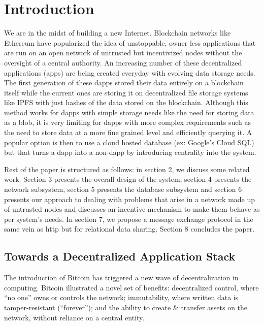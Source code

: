 \section{Introduction}\label{sec:intro}
We are in the midst of building a new Internet. Blockchain networks like Ethereum have popularized the idea of unstoppable, owner less applications that are run on an open network of untrusted but incentivized nodes without the oversight of a central authority. An increasing number of these decentralized applications (\DJ apps) are being created everyday with evolving data storage needs. The first generation of these dapps stored their data entirely on a blockchain itself while the current ones are storing it on decentralized file storage systems like IPFS with just hashes of the data stored on the blockchain. Although this method works for dapps with simple storage needs like the need for storing data as a blob, it is very limiting for dapps with more complex requirements such as the need to store data at a more fine grained level and efficiently querying it. A popular option is then to use a cloud hosted database (ex: Google’s Cloud SQL) but that turns a dapp into a non-dapp by introducing centrality into the system. \newline\newline

Rest of the paper is structured as follows: in section 2, we discuss some related work. Section 3 presents the overall design of the system, section 4 presents the network subsystem, section 5 presents the database subsystem and section 6 presents our approach to dealing with problems that arise in a network made up of untrusted nodes and discusses an incentive mechanism to make them behave as per system's needs. In section 7, we propose a message exchange protocol in the same vein as http but for relational data sharing. Section 8 concludes the paper.


\subsection{Towards a Decentralized Application Stack}

The introduction of Bitcoin \cite{nakamoto2009bitcoin} has triggered a new wave of decentralization in computing. 
Bitcoin illustrated a novel set of benefits: decentralized control, where ``no one'' owns or controls the network; immutability,
where written data is tamper-resistant (``forever''); and the ability to create \& transfer assets on the network, without reliance on a central entity.

